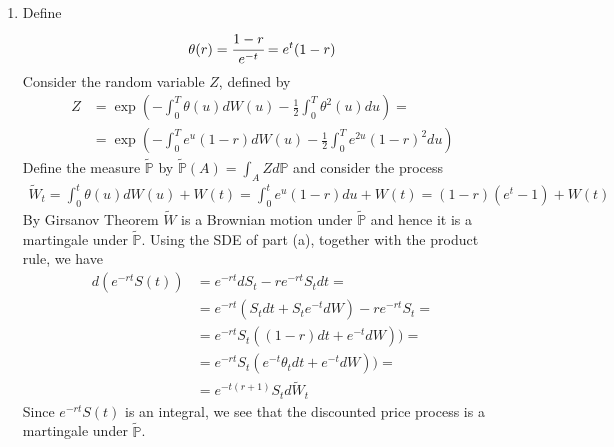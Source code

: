 \documentclass[12pt,a4paper]{exam}
\begin{document}
\begin{questions}
\begin{solution}
\begin{enumerate}[label=(\alph*),font=\itshape]
\begin{equation*}
\end{equation*} 
we have 
\begin{equation*}
dX(t) = e^{-t}dW(t) + (1-\frac{1}{2}e^{-2t})dt
\end{equation*} 
and $dX(t)dX(t)=e^{-2t} dt$. Note that $S(t)=S(0)e^{X(t)}$, so let $f(x)=S(0)e^x$, then $f_x(x)=f_{xx}(x)=f(x)$. By the \ito formula we get
\begin{equation*}
\begin{aligned}
dS_t &= df(X_t) = S_tdX+\frac{1}{2}S(t)dXdX = \\
&=S_t\left(e^{-t}dW + (1-\frac{1}{2}e^{-2t})dt\right)+\frac{1}{2}S_t e^{-2t}dt = \\
&=S_t dt+S_t e^{-t}dW
\end{aligned}
\end{equation*}
This shows that $S_t$ is an \ito process.
\item Define 
\begin{equation*}
\theta(r)=\cfrac{1-r}{e^{-t}}=e^t (1-r)
\end{equation*}
Consider the random variable $Z$, defined by
\begin{equation*}
\begin{aligned}
Z &= \exp\left(-\int_0^T \theta(u)dW(u) - \frac{1}{2}\int_0^T \theta^2(u)du\right) = \\
&=\exp\left(-\int_0^T e^u (1-r)dW(u) - \frac{1}{2}\int_0^T e^{2u} (1-r)^2 du\right)
\end{aligned}
\end{equation*}
Define the measure $\tilde{\mathbb{P}}$ by $\tilde{\mathbb{P}}(A) =\int_A Z d\mathbb{P}$ and consider the process 
\begin{equation*}
\begin{aligned}
\tilde{W}_t = \int_0^t \theta(u)dW(u) +W(t) = \int_0^t e^{u}(1-r)du+W(t)=(1-r)(e^t -1)+W(t)
\end{aligned}
\end{equation*}
By Girsanov Theorem $\tilde{W}$ is a Brownian motion under $\tilde{\mathbb{P}}$ and hence it is a martingale under $\tilde{\mathbb{P}}$. 
Using the SDE of part (a), together with the \ito product rule, we have 
\begin{equation*}
\begin{aligned}
d(e^{-rt}S(t)) &= e^{-rt}dS_t-r e^{-rt}S_t dt = \\
&= e^{-rt}(S_t dt + S_te^{-t}dW)-re^{-rt}S_t = \\
&= e^{-rt}S_t((1-r)dt + e^{-t}dW)) = \\
&= e^{-rt}S_t(e^{-t}\theta_t dt + e^{-t}dW)) = \\
&= e^{-t(r+1)}S_t d\tilde{W}_t
\end{aligned}
\end{equation*}
Since $e^{-rt}S(t)$ is an \ito integral, we see that the discounted price process is a martingale under $\tilde{\mathbb{P}}$.
\end{enumerate}
\end{solution}


\end{questions}
\end{document}
